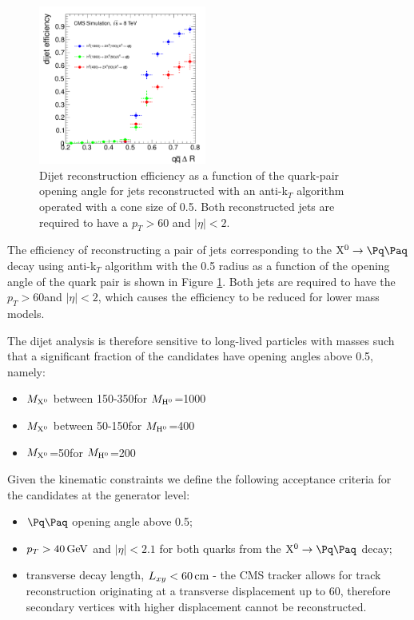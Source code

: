 \begin{figure}[htbp]
\centering
\includegraphics[width=0.49\textwidth]{plots/signal/effDijet.pdf}
\caption{Dijet reconstruction efficiency as a function of the quark-pair opening angle for jets reconstructed with an
anti-k$_T$ algorithm operated with a cone size of 0.5. Both reconstructed jets are required to have a $p_T>60$\GeV
and $|\eta|<2$.  \label{fig:effdR}}
\end{figure}

The efficiency of reconstructing a pair of jets
 corresponding to the $\X \to \qq$ decay using anti-k$_T$ algorithm with the 0.5 radius as a function of the
opening angle of the quark pair is shown in Figure \ref{fig:effdR}. Both jets are required 
to have the $p_T>60$\GeV and $|\eta|<2$, which causes the 
efficiency to be reduced for lower \Higgs  mass models.
 

The dijet analysis is therefore sensitive to long-lived \X particles with masses
such that a significant fraction of the candidates have opening angles above 0.5, namely:
\begin{itemize}
\item $M_{\mathrm{X^{0}}}$ between 150-350\GeV for $M_{\mathrm{H}^{0}}$=1000\GeV
\item $M_{\mathrm{X^{0}}}$ between 50-150\GeV for $M_{\mathrm{H}^{0}}$=400\GeV
\item $M_{\mathrm{X^{0}}}$=50\GeV for $M_{\mathrm{H}^{0}}$=200\GeV
\end{itemize}

Given the kinematic constraints we define the following acceptance criteria 
for the \X candidates at the generator level:
\begin{itemize}
 \item $\qq$ opening angle above 0.5;
 \item $p_T>40\,\text{Ge\hspace{-.08em}V}$ and $|\eta|<2.1$ for both quarks from the $\X \to \qq$ decay;
 \item transverse decay length, $L_{xy}<60\,\text{cm}$ - the CMS tracker allows for track reconstruction originating at
a transverse displacement up to 60\cm, therefore secondary vertices with higher displacement cannot be reconstructed.
\end{itemize}

